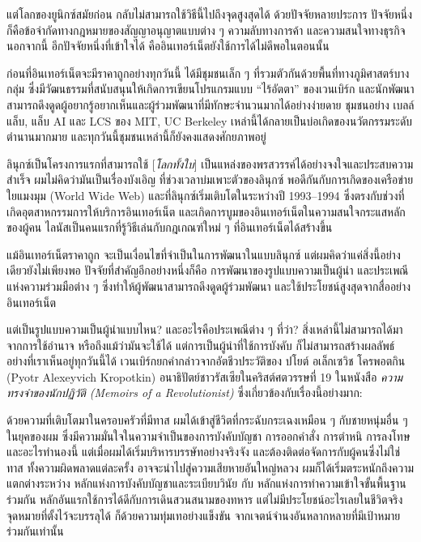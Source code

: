 แต่โลกของยูนิกซ์สมัยก่อน กลับไม่สามารถใช้วิธีนี้ไปถึงจุดสูงสุดได้
ด้วยปัจจัยหลายประการ
ปัจจัยหนึ่งก็คือข้อจำกัดทางกฎหมายของสัญญาอนุญาตแบบต่าง ๆ  ความลับทางการค้า
และความสนใจทางธุรกิจ นอกจากนี้ อีกปัจจัยหนึ่งที่เข้าใจได้
คืออินเทอร์เน็ตยังใช้การได้ไม่ดีพอในตอนนั้น

ก่อนที่อินเทอร์เน็ตจะมีราคาถูกอย่างทุกวันนี้ ได้มีชุมชนเล็ก ๆ
ที่รวมตัวกันด้วยพื้นที่ทางภูมิศาสตร์บางกลุ่ม
ซึ่งมีวัฒนธรรมที่สนับสนุนให้เกิดการเขียนโปรแกรมแบบ ``ไร้อัตตา''
ของเวนเบิร์ก
และนักพัฒนาสามารถดึงดูดผู้อยากรู้อยากเห็นและผู้ร่วมพัฒนาที่มีทักษะจำนวนมากได้อย่างง่ายดาย
ชุมชนอย่าง เบลล์แล็บ, แล็บ AI และ LCS ของ MIT, UC Berkeley
เหล่านี้ได้กลายเป็นบ่อเกิดของนวัตกรรมระดับตำนานมากมาย
และทุกวันนี้ชุมชนเหล่านี้ก็ยังคงแสดงศักยภาพอยู่

ลินุกซ์เป็นโครงการแรกที่สามารถใช้ {[}\emph{โลกทั้งใบ}{]}
เป็นแหล่งของพรสวรรค์ได้อย่างจงใจและประสบความสำเร็จ
ผมไม่คิดว่ามันเป็นเรื่องบังเอิญ ที่ช่วงเวลาบ่มเพาะตัวของลินุกซ์
พอดีกันกับการเกิดของเครือข่ายใยแมงมุม (World Wide Web)
และที่ลินุกซ์เริ่มเติบโตในระหว่างปี 1993--1994
ซึ่งตรงกับช่วงที่เกิดอุตสาหกรรมการให้บริการอินเทอร์เน็ต
และเกิดการบูมของอินเทอร์เน็ตในความสนใจกระแสหลักของผู้คน
ไลนัสเป็นคนแรกที่รู้วิธีเล่นกับกฎเกณฑ์ใหม่ ๆ  ที่อินเทอร์เน็ตได้สร้างขึ้น

แม้อินเทอร์เน็ตราคาถูก จะเป็นเงื่อนไขที่จำเป็นในการพัฒนาในแบบลินุกซ์
แต่ผมคิดว่าแค่สิ่งนี้อย่างเดียวยังไม่เพียงพอ
ปัจจัยที่สำคัญอีกอย่างหนึ่งก็คือ การพัฒนาของรูปแบบความเป็นผู้นำ
และประเพณีแห่งความร่วมมือต่าง ๆ  ซึ่งทำให้ผู้พัฒนาสามารถดึงดูดผู้ร่วมพัฒนา
และใช้ประโยชน์สูงสุดจากสื่ออย่างอินเทอร์เน็ต

แต่เป็นรูปแบบความเป็นผู้นำแบบไหน? และอะไรคือประเพณีต่าง ๆ  ที่ว่า?
สิ่งเหล่านี้ไม่สามารถได้มาจากการใช้อำนาจ หรือถึงแม้ว่ามันจะใช้ได้
แต่การเป็นผู้นำที่ใช้การบังคับ
ก็ไม่สามารถสร้างผลลัพธ์อย่างที่เราเห็นอยู่ทุกวันนี้ได้
เวนเบิร์กยกคำกล่าวจากอัตชีวประวัติของ ปโยต์ อเล็กเซวิช โครพอตกิน (Pyotr
Alexeyvich Kropotkin) อนาธิปัตย์ชาวรัสเซียในคริสต์ศตวรรษที่ 19 ในหนังสือ
\emph{ความทรงจำของนักปฏิวัติ (Memoirs of a Revolutionist)}
ซึ่งเกี่ยวข้องกับเรื่องนี้อย่างมาก:

\begin{fancyquotes}
  ด้วยความที่เติบโตมาในครอบครัวที่มีทาส
  ผมได้เข้าสู่ชีวิตที่กระฉับกระเฉงเหมือน ๆ  กับชายหนุ่มอื่น ๆ  ในยุคของผม
  ซึ่งมีความมั่นใจในความจำเป็นของการบังคับบัญชา การออกคำสั่ง การตำหนิ
  การลงโทษ และอะไรทำนองนี้ แต่เมื่อผมได้เริ่มบริหารบรรษัทอย่างจริงจัง
  และต้องติดต่อจัดการกับผู้คนซึ่งไม่ใช่ทาส ทั้งความผิดพลาดแต่ละครั้ง
  อาจจะนำไปสู่ความเสียหายอันใหญ่หลวง
  ผมก็ได้เริ่มตระหนักถึงความแตกต่างระหว่าง
  หลักแห่งการบังคับบัญชาและระเบียบวินัย กับ
  หลักแห่งการทำความเข้าใจขั้นพื้นฐานร่วมกัน
  หลักอันแรกใช้การได้ดีกับการเดินสวนสนามของทหาร
  แต่ไม่มีประโยชน์อะไรเลยในชีวิตจริง จุดหมายที่ตั้งไว้จะบรรลุได้
  ก็ด้วยความทุ่มเทอย่างแข็งขัน
  จากเจตน์จำนงอันหลากหลายที่มีเป้าหมายร่วมกันเท่านั้น
\end{fancyquotes}

